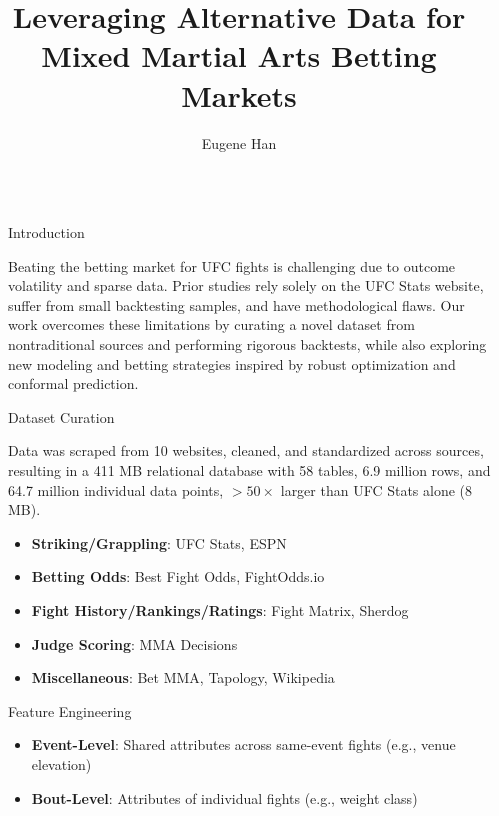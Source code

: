\documentclass[final]{beamer}
\title{Leveraging Alternative Data for Mixed Martial Arts Betting Markets}
\author{Eugene Han}
\institute[shortinst]{Yale University, Department of Statistics \& Data Science}
\newlength{\sepwidth}
\newlength{\colwidth}
\newcommand{\separatorcolumn}{\begin{column}{\sepwidth}\end{column}}
\begin{document}
\begin{frame}[t]
\begin{columns}[t]
\separatorcolumn

\begin{column}{\colwidth}

  \begin{block}{Introduction}

    Beating the betting market for UFC fights is challenging due to outcome volatility and sparse data. Prior studies rely solely on the UFC Stats website, suffer from small backtesting samples, and have methodological flaws. Our work overcomes these limitations by curating a novel dataset from nontraditional sources and performing rigorous backtests, while also exploring new modeling and betting strategies inspired by robust optimization and conformal prediction.

  \end{block}

  \begin{block}{Dataset Curation}

    Data was scraped from 10 websites, cleaned, and standardized across sources, resulting in a 411 MB relational database with 58 tables, 6.9 million rows, and 64.7 million individual data points, $>50\times$ larger than UFC Stats alone (8 MB).
    \begin{itemize}
        \item \textbf{Striking/Grappling}: UFC Stats, ESPN
        \item \textbf{Betting Odds}: Best Fight Odds, FightOdds.io
        \item \textbf{Fight History/Rankings/Ratings}: Fight Matrix, Sherdog
        \item \textbf{Judge Scoring}: MMA Decisions
        \item \textbf{Miscellaneous}: Bet MMA, Tapology, Wikipedia
    \end{itemize}

  \end{block}

  \begin{block}{Feature Engineering}

    \begin{itemize}
        \item \textbf{Event-Level}: Shared attributes across same-event fights (e.g., venue elevation)

        \item \textbf{Bout-Level}: Attributes of individual fights (e.g., weight class)


\end{itemize}
\end{block}
\end{column}
\end{columns}
\end{frame}
\end{document}
